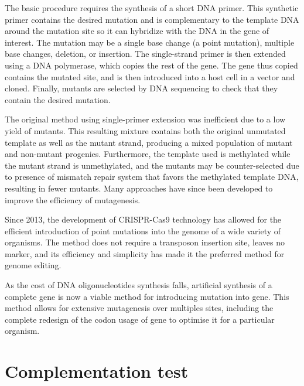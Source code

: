 The basic procedure requires the synthesis of a short DNA primer. This synthetic primer contains the desired mutation and is complementary to the template DNA around the mutation site so it can hybridize with the DNA in the gene of interest. The mutation may be a single base change (a point mutation), multiple base changes, deletion, or insertion. The single-strand primer is then extended using a DNA polymerase, which copies the rest of the gene. The gene thus copied contains the mutated site, and is then introduced into a host cell in a vector and cloned. Finally, mutants are selected by DNA sequencing to check that they contain the desired mutation.

The original method using single-primer extension was inefficient due to a low yield of mutants. This resulting mixture contains both the original unmutated template as well as the mutant strand, producing a mixed population of mutant and non-mutant progenies. Furthermore, the template used is methylated while the mutant strand is unmethylated, and the mutants may be counter-selected due to presence of mismatch repair system that favors the methylated template DNA, resulting in fewer mutants. Many approaches have since been developed to improve the efficiency of mutagenesis.

Since 2013, the development of CRISPR-Cas9 technology has allowed for the efficient introduction of point mutations into the genome of a wide variety of organisms. The method does not require a transposon insertion site, leaves no marker, and its efficiency and simplicity has made it the preferred method for genome editing.

As the cost of DNA oligonucleotides synthesis falls, artificial synthesis of a complete gene is now a viable method for introducing mutation into gene. This method allows for extensive mutagenesis over multiples sites, including the complete redesign of the codon usage of gene to optimise it for a particular organism.

\hypertarget{complementation-test}{%
\section{Complementation test}\label{complementation-test}}


